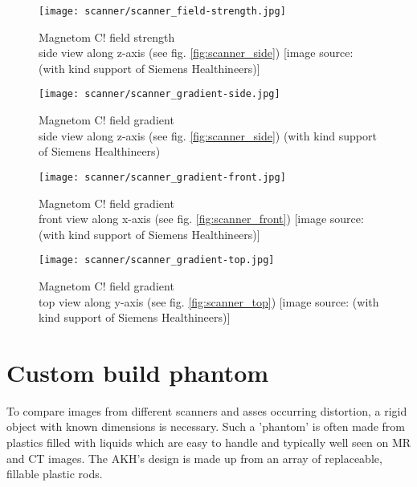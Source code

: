 \begin{figure}[!htb]
  	\centering
      \texttt{[image: scanner/scanner\_field-strength.jpg]}
      \caption{Magnetom C! field strength\\ side view along z-axis (see fig. \ref{fig:scanner_side}) [image source: \cite{magnetom_handbook} (with kind support of Siemens Healthineers)]}
    \label{fig:strength_side}
\end{figure}

\begin{figure}[!htb]
    	\centering
        \texttt{[image: scanner/scanner\_gradient-side.jpg]}
        \caption{Magnetom C! field gradient\\ side view along z-axis (see fig. \ref{fig:scanner_side}) \cite{magnetom_handbook} (with kind support of Siemens Healthineers)}
        \label{fig:gradient_side}
\end{figure}

\begin{figure}[!htb]
  	\centering
    \texttt{[image: scanner/scanner\_gradient-front.jpg]}
    \caption{Magnetom C! field gradient\\ front view along x-axis (see fig. \ref{fig:scanner_front}) [image source: \cite{magnetom_handbook} (with kind support of Siemens Healthineers)]}
    \label{fig:gradient_front}
    \end{figure}

\begin{figure}[!htb]
  	\centering
    \texttt{[image: scanner/scanner\_gradient-top.jpg]}
    \caption{Magnetom C! field gradient\\ top view along y-axis (see fig. \ref{fig:scanner_top}) [image source: \cite{magnetom_handbook} (with kind support of Siemens Healthineers)]}
    \label{fig:gradient_top}
\end{figure}


\section{Custom build phantom}

To compare images from different scanners and asses occurring distortion, a rigid object with known dimensions is necessary.
Such a 'phantom' is often made from plastics filled with liquids which are easy to handle and typically well seen on MR and CT images.
The AKH's design is made up from an array of replaceable, fillable plastic rods.

